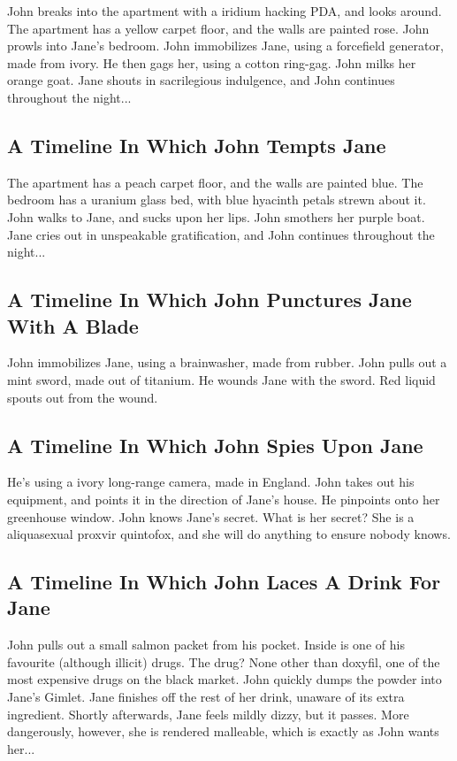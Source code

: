 \documentclass{article}
\begin{document}
John breaks into the apartment with a iridium hacking PDA, and looks around.
The apartment has a yellow carpet floor, and the walls are painted rose.
John prowls into Jane's bedroom.
John immobilizes Jane, using a forcefield generator, made from ivory.
He then gags her, using a cotton ring{-}gag.
John milks her orange goat.
Jane shouts in sacrilegious indulgence, and John continues throughout the night...
\subsection{A Timeline In Which John Tempts Jane}


The apartment has a peach carpet floor, and the walls are painted blue.
The bedroom has a uranium glass bed, with blue hyacinth petals strewn about it.
John walks to Jane, and sucks upon her lips.
John smothers her purple boat.
Jane cries out in unspeakable gratification, and John continues throughout the night...
\subsection{A Timeline In Which John Punctures Jane With A Blade}


John immobilizes Jane, using a brainwasher, made from rubber.
John pulls out a mint sword, made out of titanium.
He wounds Jane with the sword.
Red liquid spouts out from the wound.
\subsection{A Timeline In Which John Spies Upon Jane}


He's using a ivory long{-}range camera, made in England.
John takes out his equipment, and points it in the direction of Jane's house. He pinpoints onto her greenhouse window.
John knows Jane's secret. What is her secret? She is a aliquasexual proxvir quintofox, and she will do anything to ensure nobody knows.
\subsection{A Timeline In Which John Laces A Drink For Jane}


John pulls out a small salmon packet from his pocket. Inside is one of his favourite (although illicit) drugs.
The drug? None other than doxyfil, one of the most expensive drugs on the black market.
John quickly dumps the powder into Jane's Gimlet.
Jane finishes off the rest of her drink, unaware of its extra ingredient.
Shortly afterwards, Jane feels mildly dizzy, but it passes.
More dangerously, however, she is rendered malleable, which is exactly as John wants her...
\end{document}
